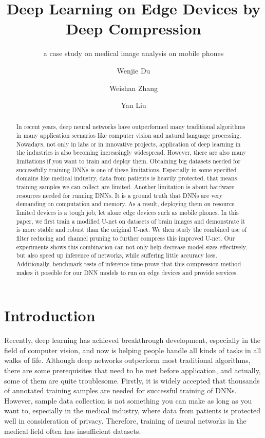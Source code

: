 \documentclass[sigconf]{acmart}
\begin{document}
\title{Deep Learning on Edge Devices by Deep Compression}
\subtitle{a case study on medical image analysis on mobile phones}


\author{Wenjie Du}

\author{Weishan Zhang}

\author{Yan Liu}
 
 
\begin{abstract}
In recent years, deep neural networks have outperformed many traditional algorithms in many application scenarios like computer vision and natural language processing. Nowadays, not only in labs or in innovative projects, application of deep learning in the industries is also becoming increasingly widespread. However, there are also many limitations if you want to train and deploy them. Obtaining big datasets needed for successfully training DNNs is one of these limitations. Especially in some specified domains like medical industry, data from patients is heavily protected, that means training samples we can collect are limited. Another limitation is about hardware resources needed for running DNNs. It is a ground truth that DNNs are very demanding on computation and memory. As a result, deploying them on resource limited devices is a tough job, let alone edge devices such as mobile phones. In this paper, we first train a modified U-net \cite{improved-unet} on datasets of brain images and demonstrate it is more stable and robust than the original U-net\cite{unet}. We then study the combined use of filter reducing and channel pruning to further compress this improved U-net. Our experiments shows this combination can not only help decrease model sizes effectively, but also speed up inference of networks, while suffering little accuracy loss. Additionally, benchmark tests of inference time prove that this compression method makes it possible for our DNN models to run on edge devices and provide services.
\end{abstract}


\section{Introduction}
Recently, deep learning has achieved breakthrough development, especially in the field of computer vision, and now is helping people handle all kinds of tasks in all walks of life. Although deep networks outperform most traditional algorithms, there are some prerequisites that need to be met before application, and actually, some of them are quite troublesome. Firstly, it is widely accepted that thousands of annotated training samples are needed for successful training of DNNs. However, sample data collection is not something you can make as long as you want to, especially in the medical industry, where data from patients is protected well in consideration of privacy. Therefore, training of neural networks in the medical field often has insufficient datasets.
\end{document}
